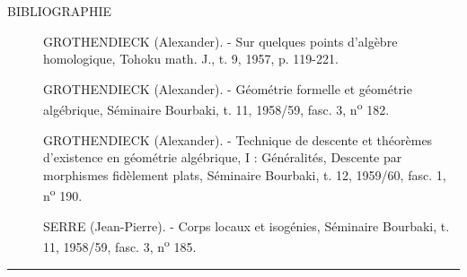 \begin{center}
  BIBLIOGRAPHIE
\end{center}

\begin{description}
  \item[{\normalfont[1]}] GROTHENDIECK (Alexander). - Sur quelques points
    d'algèbre homologique, Tohoku math. J., t. 9, 1957, p. 119-221.
  \item[{\normalfont[2]}] GROTHENDIECK (Alexander). - Géométrie formelle et
    géométrie algébrique, Séminaire Bourbaki, t. 11, 1958/59, fasc. 3,
    n\textsuperscript{o} 182.
  \item[{\normalfont[3]}] GROTHENDIECK (Alexander). - Technique de descente et
    théorèmes d'existence en géométrie algébrique, I : Généralités, Descente
    par morphismes fidèlement plats, Séminaire Bourbaki, t. 12, 1959/60,
    fasc. 1, n\textsuperscript{o} 190.
  \item[{\normalfont[4]}] SERRE (Jean-Pierre). - Corps locaux et isogénies,
    Séminaire Bourbaki, t. 11, 1958/59, fasc. 3, n\textsuperscript{o} 185.
\end{description}

\begin{center}
  \rule{.14\linewidth}{.3pt}
\end{center}
